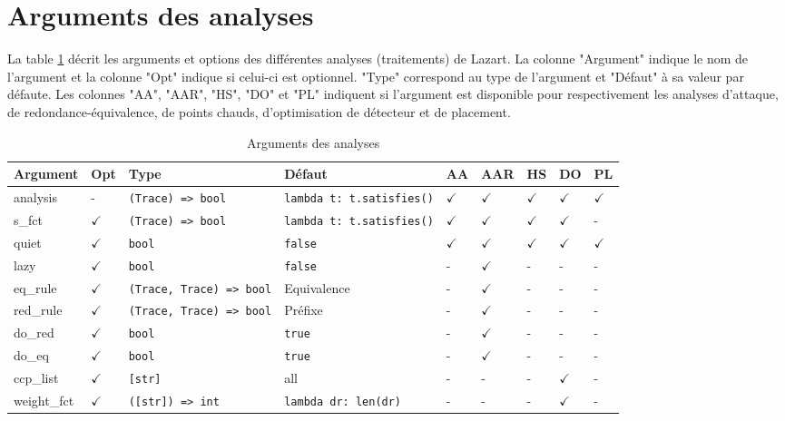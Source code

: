    \section{Arguments des analyses}
    \label{annexe:lz:param-analysis}

        La table \ref{tbl:lz:param-analysis} décrit les arguments et options des différentes analyses (traitements) de Lazart.
        La colonne "Argument" indique le nom de l'argument et la colonne "Opt" indique si celui-ci est optionnel.
        "Type" correspond au type de l'argument et "Défaut" à sa valeur par défaute.
        Les colonnes "AA", "AAR", "HS", "DO" et "PL" indiquent si l'argument est disponible pour respectivement les analyses d'attaque, de redondance-équivalence, de points chauds, d'optimisation de détecteur et de placement.
    
        \begin{table}[htp]
        \footnotesize
        \centering
            \setlength\tabcolsep{3pt}
            \begin{tabular}{|l|l|l|l|l|l|l|l|l|}
            \hline
            Argument & Opt & Type & Défaut & AA & AAR & HS & DO & PL \\ \hline
            analysis & - & \texttt{(Trace) => bool} & \texttt{lambda t: t.satisfies()} & $\checkmark$ & $\checkmark$ & $\checkmark$ & $\checkmark$ & $\checkmark$ \\ \hline
            s\_fct & $\checkmark$ & \texttt{(Trace) => bool} & \texttt{lambda t: t.satisfies()} & $\checkmark$ & $\checkmark$ & $\checkmark$ & $\checkmark$ & - \\ \hline
            quiet & $\checkmark$ & \texttt{bool} & \texttt{false} & $\checkmark$ & $\checkmark$ & $\checkmark$ & $\checkmark$ & $\checkmark$ \\ \hline
            lazy & $\checkmark$ & \texttt{bool} & \texttt{false} & - & $\checkmark$ & - & - & - \\ \hline
            eq\_rule & $\checkmark$ & \texttt{(Trace, Trace) => bool} & Equivalence & - & $\checkmark$ & - & - & - \\ \hline
            red\_rule & $\checkmark$ & \texttt{(Trace, Trace) => bool} & Préfixe & - & $\checkmark$ & - & - & - \\ \hline
            do\_red & $\checkmark$ & \texttt{bool} & \texttt{true} & - & $\checkmark$ & - & - & - \\ \hline
            do\_eq & $\checkmark$ & \texttt{bool} & \texttt{true} & - & $\checkmark$ & - & - & - \\ \hline
            ccp\_list & $\checkmark$ & \texttt{[str]} & all & - & - & - & $\checkmark$ & - \\ \hline
            weight\_fct & $\checkmark$ & \texttt{([str]) => int} & \texttt{lambda dr: len(dr)} & - & - & - & $\checkmark$ & - \\ \hline
            \end{tabular} 
        \caption{Arguments des analyses}
        \label{tbl:lz:param-analysis}
        \end{table}
        
